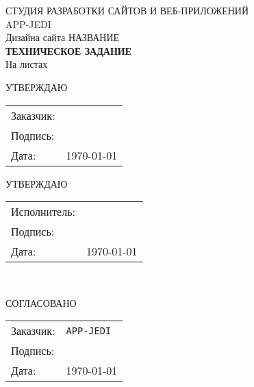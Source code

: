 %
\begin{center}
{\Large {{СТУДИЯ РАЗРАБОТКИ САЙТОВ И ВЕБ-ПРИЛОЖЕНИЙ \\ {\LARGE APP-JEDI}}}}\\[4cm]

{\huge Дизайна сайта {\LARGE НАЗВАНИЕ}} \\[0.5cm]
{ \Huge \bf ТЕХНИЧЕСКОЕ ЗАДАНИЕ}\\[0.5cm]
На \pageref{LastPage} листах\\[3.5cm]

\begin{minipage}{\textwidth}
  \begin{minipage}{0.5\textwidth}

    \begin{flushleft}
      \begin{center}
        {\large УТВЕРЖДАЮ}\\
      \end{center}
      \begin{tabular}{ll}
        Заказчик: & \\
        Подпись: & \\
        Дата: & \today
      \end{tabular}
    \end{flushleft}
  \end{minipage}
  \begin{minipage}{0.5\textwidth}
    \begin{flushleft}
      \begin{center}
        {\large УТВЕРЖДАЮ}\\
      \end{center}
      \begin{tabular}{ll}
        Исполнитель: & \\
        Подпись: & \\
        Дата: & \today
      \end{tabular}
    \end{flushleft}
  \end{minipage}
\end{minipage}
\\[5cm]

\begin{flushleft}
\begin{minipage}{0.5\textwidth}
\begin{center}
  СОГЛАСОВАНО
\end{center}
\begin{tabular}{ll}
  Заказчик: & \texttt{APP-JEDI}\\
  Подпись: & \\
  Дата: & \today
\end{tabular}
\end{minipage}
\end{flushleft}
\end{center}
\thispagestyle{empty}
